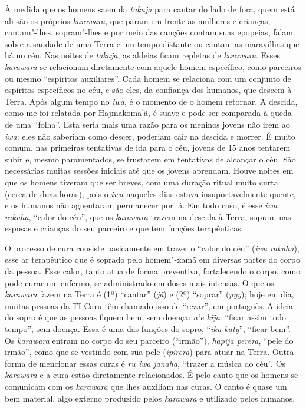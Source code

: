À medida que os homens saem da \emph{takaja} para cantar do lado de
fora, quem está ali são os próprios \emph{karawara}, que param em frente
as mulheres e crianças, cantam"-lhes, sopram"-lhes e por meio das canções
contam suas epopeias, falam sobre a saudade de uma Terra e um tempo
distante ou cantam as maravilhas que há no céu. Nas noites de
\emph{takaja}, as aldeias ficam repletas de \emph{karawara}. Esses
\emph{karawara} se relacionam diretamente com aquele homem específico,
como parceiros ou mesmo ``espíritos auxiliares''. Cada homem se
relaciona com um conjunto de espíritos específicos no céu, e são eles,
da confiança dos humanos, que descem à Terra. Após algum tempo no
\emph{iwa}, é o momento de o homem retornar. A descida, como me foi
relatada por Hajmakoma'ã, é suave e pode ser comparada à queda de uma
``folha''. Esta seria mais uma razão para os meninos jovens não irem ao
\emph{iwa}: eles não saberiam como descer, poderiam cair na descida e
morrer. É muito comum, nas primeiras tentativas de ida para o céu,
jovens de 15 anos tentarem subir e, mesmo paramentados, se frustarem em
tentativas de alcançar o céu. São necessárias muitas sessões iniciais
até que os jovens aprendam. Houve noites em que os homens tiveram que
ser breves, com uma duração ritual muito curta (cerca de duas horas),
pois o \emph{iwa} naqueles dias estava insuportavelmente quente, e os
humanos não aguentaram permanecer por lá. Em todo caso, é esse \emph{iwa
rakuha}, ``calor do céu'', que os \emph{karawara} trazem na descida à
Terra, sopram nas esposas e crianças do seu parceiro e que tem funções
terapêuticas.

O processo de cura consiste basicamente em trazer o ``calor do céu''
(\emph{iwa} \emph{rakuha}), esse ar terapêutico que é soprado pelo
homem"-xamã em diversas partes do corpo da pessoa. Esse calor, tanto atua
de forma preventiva, fortalecendo o corpo, como pode curar um enfermo,
se administrado em doses mais intensas. O que os \emph{karawara} fazem
na Terra é (1º) ``cantar'' (\emph{jã}) e (2º) ``soprar'' (\emph{pyy});
hoje em dia, muitas pessoas da TI Caru têm chamado isso de ``rezar'', em
português. A ideia do sopro é que as pessoas fiquem bem, sem doença:
\emph{a'e kĩja}: ``ficar assim todo tempo'', sem doença. Essa é uma das
funções do sopro, ``\emph{iku katy}'', ``ficar bem''. Os \emph{karawara}
entram no corpo do seu parceiro (``irmão''), \emph{hapija perera},
``pele do irmão'', como que se vestindo com sua pele (\emph{ipirera})
para atuar na Terra. Outra forma de mencionar essas curas é \emph{ru
iwa} \emph{janaha}, ``trazer a música do céu''. Os \emph{karawara} e a
cura estão diretamente relacionados. É pelo canto que os homens se
comunicam com os \emph{karawara} que lhes auxiliam nas curas. O canto é
quase um bem material, algo externo produzido pelos \emph{karawara} e
utilizado pelos humanos.

